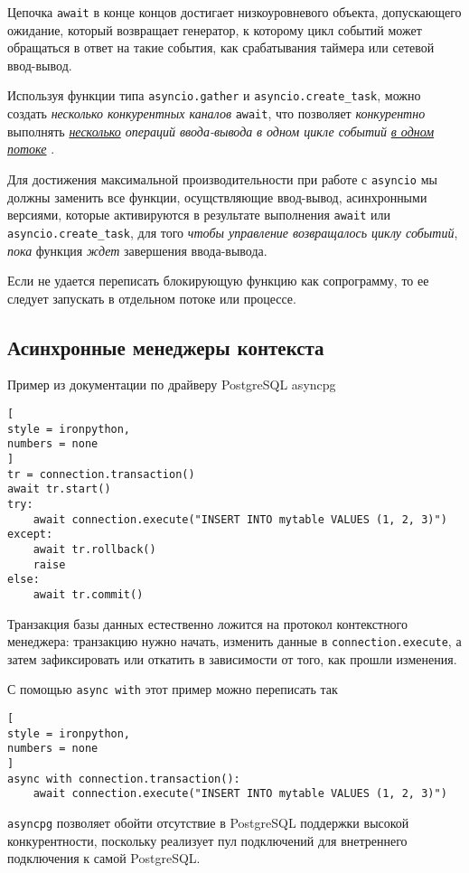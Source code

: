 \documentclass[%
	11pt,
	a4paper,
	utf8,
		]{article}
\begin{document}
Цепочка \verb*|await| в конце концов достигает низкоуровневого объекта, допускающего ожидание, который возвращает генератор, к которому цикл событий может обращаться в ответ на такие события, как срабатывания таймера или сетевой ввод-вывод.

Используя функции типа \verb|asyncio.gather| и \verb*|asyncio.create_task|, можно создать \emph{\color{blue}несколько конкурентных каналов} {\color{blue}\verb|await|}, что позволяет \emph{конкурентно} выполнять \emph{\underline{несколько} операций ввода-вывода} \emph{в одном цикле событий} \underline{\itshape в одном потоке} \cite[]{ramalho:python-2022}.

Для достижения максимальной производительности при работе с \verb*|asyncio| мы должны заменить все функции, осущствляющие ввод-вывод, асинхронными версиями, которые активируются в результате выполнения \verb|await| или \verb*|asyncio.create_task|, для того \emph{чтобы управление возвращалось циклу событий}, \emph{пока} функция \emph{ждет} завершения ввода-вывода.

Если не удается переписать блокирующую функцию как сопрограмму, то ее следует запускать в отдельном потоке или процессе.

\subsection{Асинхронные менеджеры контекста}

Пример из документации по драйверу PostgreSQL asyncpg
\begin{lstlisting}[
style = ironpython,
numbers = none
]
tr = connection.transaction()
await tr.start()
try:
    await connection.execute("INSERT INTO mytable VALUES (1, 2, 3)")
except:
    await tr.rollback()
    raise
else:
    await tr.commit()
\end{lstlisting}

Транзакция базы данных естественно ложится на протокол контекстного менеджера: транзакцию нужно начать, изменить данные в \verb|connection.execute|, а затем зафиксировать или откатить в зависимости от того, как прошли изменения.

С помощью \verb*|async with| этот пример можно переписать так
\begin{lstlisting}[
style = ironpython,
numbers = none
]
async with connection.transaction():
    await connection.execute("INSERT INTO mytable VALUES (1, 2, 3)")
\end{lstlisting}

\verb|asyncpg| позволяет обойти отсутствие в PostgreSQL поддержки высокой конкурентности, поскольку реализует пул подключений для внетреннего подключения к самой PostgreSQL.
\end{document}
